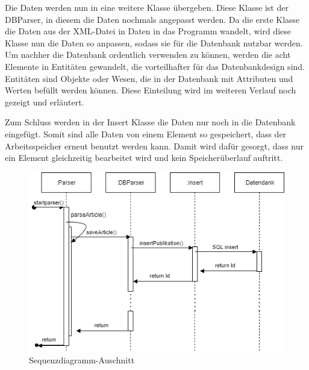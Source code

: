 Die Daten werden nun in eine weitere Klasse übergeben. Diese Klasse ist der DBParser, in diesem die Daten nochmals angepasst werden. Da die erste Klasse die Daten aus der XML-Datei in Daten in das Programm wandelt, wird diese Klasse nun die Daten so anpassen, sodass sie für die Datenbank nutzbar werden. Um nachher die Datenbank ordentlich verwenden zu können, werden die acht Elemente in Entitäten gewandelt, die vorteilhafter für das Datenbankdesign sind. Entitäten sind Objekte oder Wesen, die in der Datenbank mit Attributen und Werten befüllt werden können. Diese Einteilung wird im weiteren Verlauf noch gezeigt und erläutert. 

Zum Schluss werden in der Insert Klasse die Daten nur noch in die Datenbank eingefügt. Somit sind alle Daten von einem Element so gespeichert, dass der Arbeitsspeicher erneut benutzt werden kann. Damit wird dafür gesorgt, dass nur ein Element gleichzeitig bearbeitet wird und kein Speicherüberlauf auftritt. 

 
\begin{figure}[!htb]
	\centering
	\includegraphics[width=15cm,keepaspectratio]{bilder/SequenzDiagramParser}
	\caption{Sequenzdiagramm-Auschnitt}
	\label{fig:sequenzdiagramm}
\end{figure}



